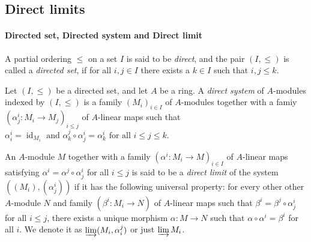 \subsection{Direct limits}

\paragraph{Directed set, Directed system and Direct limit}

A partial ordering \( \leq \) on a set \( I \) is said to be \emph{direct}, and the pair \( (I, \leq) \) is called a \emph{directed set}, if for all \( i, j \in I \) there exists a \( k \in I \) such that \( i, j \leq k \).

Let \( (I, \leq) \) be a directed set, and let \( A \) be a ring.
A \emph{direct system} of \( A \)-modules indexed by \( (I, \leq) \) is a family \( (M_i)_{i \in I} \) of \( A \)-modules together with a famiy \( (\alpha_j^i: M_i \to M_j)_{i \leq j} \) of \( A \)-linear maps such that $\alpha^i_i = \operatorname{id}_{M_i} \text{ and } \alpha_k^j \circ \alpha_j^i= \alpha_k^i \text{ for all } i \leq j \leq k.$
\begin{center}
\end{center}
An \( A \)-module \( M \) together with a family \( (\alpha^i: M_i \to M)_{i \in I} \) of \( A \)-linear maps satisfying \( \alpha^i = \alpha^j \circ \alpha^i_j \) for all \( i \leq j \) is said to be a \emph{direct limit} of the system \( ((M_i), (\alpha^i_j)) \) if it has the following universal property:
for every other other \( A \)-module \( N \) and family \( (\beta^i: M_i \to N) \) of \( A \)-linear maps such that \( \beta^i = \beta^j \circ \alpha^i_j \) for all \( i \leq j \), there exists a unique morphism \( \alpha: M \to N \) such that \( \alpha \circ \alpha^i = \beta^i \) for all \( i \).
We denote it as \( \varinjlim (M_i, \alpha^j_i) \) or just \( \varinjlim M_i \).
\begin{center}
\end{center}

